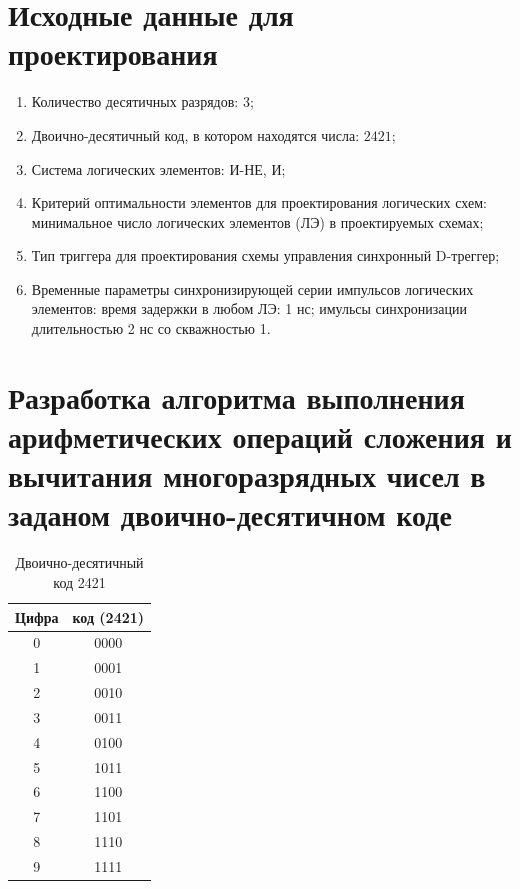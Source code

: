 \documentclass[a4paper,14pt]{article}
\begin{document}


\section{Исходные данные для проектирования}


\begin{enumerate}
	\item Количество десятичных разрядов: $3$;
	\item Двоично-десятичный код, в котором находятся числа: $2421$;
	\item Система логических элементов: И-НЕ, И;
	\item Критерий оптимальности элементов для проектирования логических схем: минимальное число логических элементов (ЛЭ) в проектируемых схемах;
	\item Тип триггера для проектирования схемы управления синхронный D-треггер;
	\item Временные параметры синхронизирующей серии импульсов логических элементов: 
	время задержки в любом ЛЭ: 1 нс; 
	имульсы синхронизации длительностью 2 нс со скважностью 1. 
\end{enumerate}

\section{Разработка алгоритма выполнения арифметических операций сложения и вычитания многоразрядных чисел в заданом двоично-десятичном коде}

\begin{table}[H]
		\begin{center}

				\caption{\label{tab:alfabet} Двоично-десятичный код 2421 }
	\begin{tabular}{|c|c|}
		\hline
		\multicolumn{1}{|l|}{Цифра} & \multicolumn{1}{l|}{код (2421)} \\ \hline
		0 & 0000 \\ \hline
		1 & 0001 \\ \hline
		2 & 0010 \\ \hline
		3 & 0011 \\ \hline
		4 & 0100 \\ \hline
		5 & 1011 \\ \hline
		6 & 1100 \\ \hline
		7 & 1101 \\ \hline
		8 & 1110 \\ \hline
		9 & 1111 \\ \hline
	\end{tabular}
\end{center}
\end{table}
\end{document}
